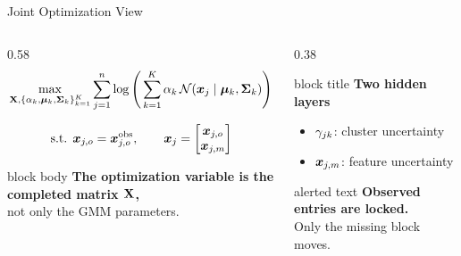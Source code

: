 \begin{frame}[shrink=3]{Joint Optimization View}
    \begin{columns}[T,onlytextwidth]
        \begin{column}{0.58\textwidth}
            \[
                \max_{\mathbf{X},\{\alpha_k,\bm{\mu}_k,\mathbf{\Sigma}_k\}_{k=1}^{K}}
                \sum_{j=1}^{n}
                \log\Bigg(
                \sum_{k=1}^{K}\alpha_k \,
                \mathcal{N}(\bm{x}_j \mid \bm{\mu}_k, \mathbf{\Sigma}_k)
                \Bigg)
            \]

            \[
                \text{s.t. } \bm{x}_{j,o}=\bm{x}_{j,o}^{\mathrm{obs}},\qquad
                \bm{x}_j=\begin{bmatrix}\bm{x}_{j,o}\\\bm{x}_{j,m}\end{bmatrix}
            \]

            \vspace{0.25cm}
            \begin{beamercolorbox}[sep=0.8em, rounded=true, shadow=true]{block body}
                \large
                \textbf{The optimization variable is the completed matrix \(\mathbf{X}\),}\\
                not only the GMM parameters.
            \end{beamercolorbox}
        \end{column}
        \begin{column}{0.38\textwidth}
            \begin{beamercolorbox}[sep=0.9em, rounded=true, shadow=true]{block title}
                \textbf{Two hidden layers}
            \end{beamercolorbox}
            \vspace{0.15cm}
            \begin{itemize}
                \item \(\gamma_{jk}\): cluster uncertainty
                \item \(\bm{x}_{j,m}\): feature uncertainty
            \end{itemize}

            \vspace{0.25cm}
            \begin{beamercolorbox}[sep=0.8em, rounded=true, shadow=true]{alerted text}
                \textbf{Observed entries are locked.}\\
                Only the missing block moves.
            \end{beamercolorbox}
        \end{column}
    \end{columns}
\end{frame}


